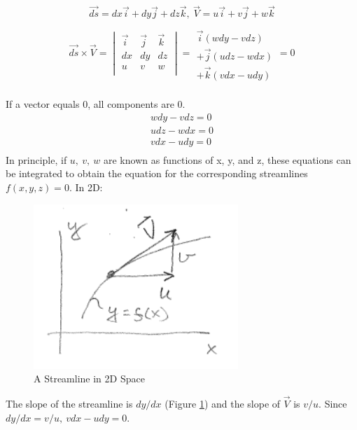 \documentclass[draft=false, titlepage]{article}
\newcommand{\partialfrac}[2]{\frac{\partial #1}{\partial #2}}
\begin{document}
 \begin{equation*}
     \vec{ds} = dx\vec{i} + dy\vec{j} + dz\vec{k},\ \vec{V} = u\vec{i} + v\vec{j} + w\vec{k}
 \end{equation*}
 \begin{equation*}
    \vec{ds} \times \vec{V} =
    \begin{vmatrix}
    \vec{i} & \vec{j} & \vec{k} \\
    dx & dy & dz \\
    u & v & w\\
    \end{vmatrix} =
    \begin{matrix}\\\\ %
    \vec{i} (wdy - vdz)\\
    + \vec{j}(udz - wdx)\\
    +\vec{k}(vdx - udy)\\
    \end{matrix} = 0
 \end{equation*}
 
 If a vector equals 0, all components are 0.
 \begin{equation*}
     \begin{matrix}
     wdy - vdz = 0\\
     udz - wdx = 0\\
     vdx - udy = 0\\
     \end{matrix}
 \end{equation*}
 In principle, if $u,\ v,\ w$ are known as functions of x, y, and z, these equations can be integrated to obtain the equation for the corresponding streamlines $f(x, y, z) = 0$. In 2D:
 \begin{figure}[ht]
     \centering
     \includegraphics[width=0.3\linewidth]{Figures/2DStreamline.PNG}
     \caption{A Streamline in 2D Space}
     \label{fig:2DStreamline}
 \end{figure}
 The slope of the streamline is $dy/dx$ (Figure \ref{fig:2DStreamline}) and the slope of $\vec{V}$ is $v/u$. Since $dy/dx = v/u,\ vdx - udy = 0$.
 
\end{document}
